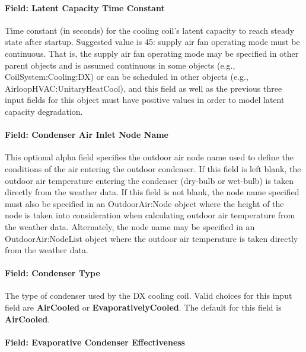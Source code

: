 \paragraph{Field: Latent Capacity Time Constant}\label{field-latent-capacity-time-constant}

Time constant (in seconds) for the cooling coil's latent capacity to reach steady state after startup. Suggested value is 45: supply air fan operating mode must be continuous. That is, the supply air fan operating mode may be specified in other parent objects and is assumed continuous in some objects (e.g., CoilSystem:Cooling:DX) or can be scheduled in other objects (e.g., AirloopHVAC:UnitaryHeatCool), and this field as well as the previous three input fields for this object must have positive values in order to model latent capacity degradation.

\paragraph{Field: Condenser Air Inlet Node Name}\label{field-condenser-air-inlet-node-name}

This optional alpha field specifies the outdoor air node name used to define the conditions of the air entering the outdoor condenser. If this field is left blank, the outdoor air temperature entering the condenser (dry-bulb or wet-bulb) is taken directly from the weather data. If this field is not blank, the node name specified must also be specified in an OutdoorAir:Node object where the height of the node is taken into consideration when calculating outdoor air temperature from the weather data. Alternately, the node name may be specified in an OutdoorAir:NodeList object where the outdoor air temperature is taken directly from the weather data.

\paragraph{Field: Condenser Type}\label{field-condenser-type}

The type of condenser used by the DX cooling coil. Valid choices for this input field are \textbf{AirCooled} or \textbf{EvaporativelyCooled}. The default for this field is \textbf{AirCooled}.

\paragraph{Field: Evaporative Condenser Effectiveness}\label{field-evaporative-condenser-effectiveness}


